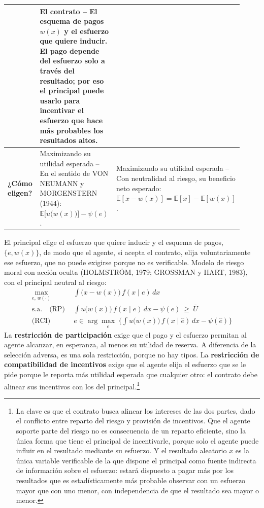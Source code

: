\documentclass[10pt,a4paper]{article}
\begin{document}
\begin{center}
\begin{tabular}{|p{0.16\linewidth}|p{0.38\linewidth}|p{0.38\linewidth}|}
{} &
El contrato -- {\scriptsize El esquema de pagos $w(x)$ y el esfuerzo que quiere inducir. El pago depende del esfuerzo solo a través del resultado; por eso el principal puede usarlo para incentivar el esfuerzo que hace más probables los resultados altos.} \\
\hline
\textbf{¿Cómo eligen?} &
Maximizando su utilidad esperada -- {\scriptsize En el sentido de VON NEUMANN y MORGENSTERN (1944): $\mathbb E\big[u\big(w(x)\big)\big]-\psi(e)$.} &
Maximizando su utilidad esperada -- {\scriptsize Con neutralidad al riesgo, su beneficio neto esperado: $\mathbb E[x-w(x)]=\mathbb E[x]-\mathbb E[w(x)]$.} \\
\hline
\end{tabular}
\end{center}

El principal elige el esfuerzo que quiere inducir y el esquema de pagos, $\{e,w(x)\}$, de modo que el agente, si acepta el contrato, elija voluntariamente ese esfuerzo, que no puede exigirse porque no es verificable. Modelo de riesgo moral con acción oculta (HOLMSTRÖM, 1979; GROSSMAN y HART, 1983), con el principal neutral al riesgo:
$$\begin{aligned}
\max_{e,\,w(\cdot)}\ \ &\int\big(x-w(x)\big)\,f(x\mid e)\,dx\\[0.5em]
\text{s.a.}\quad\text{(RP)}\ \ &\int u\big(w(x)\big)\,f(x\mid e)\,dx-\psi(e)\ \ge\ \bar U\\[0.5em]
\text{(RCI)}\ \ &e\in\arg\max_{\hat e}\ \Big\{\int u\big(w(x)\big)\,f(x\mid\hat e)\,dx-\psi(\hat e)\Big\}
\end{aligned}$$
La \textbf{restricción de participación} exige que el pago y el esfuerzo permitan al agente alcanzar, en esperanza, al menos su utilidad de reserva. A diferencia de la selección adversa, es una sola restricción, porque no hay tipos. La \textbf{restricción de compatibilidad de incentivos} exige que el agente elija el esfuerzo que se le pide porque le reporta más utilidad esperada que cualquier otro: el contrato debe alinear sus incentivos con los del principal.\footnote{%
    La clave es que el contrato busca alinear los intereses de las dos partes, dado el conflicto entre reparto del riesgo y provisión de incentivos. Que el agente soporte parte del riesgo no es consecuencia de un reparto eficiente, sino la única forma que tiene el principal de incentivarle, porque solo el agente puede influir en el resultado mediante su esfuerzo. Y el resultado aleatorio $x$ es la única variable verificable de la que dispone el principal como fuente indirecta de información sobre el esfuerzo: estará dispuesto a pagar más por los resultados que es estadísticamente más probable observar con un esfuerzo mayor que con uno menor, con independencia de que el resultado sea mayor o menor.
}
\end{document}
